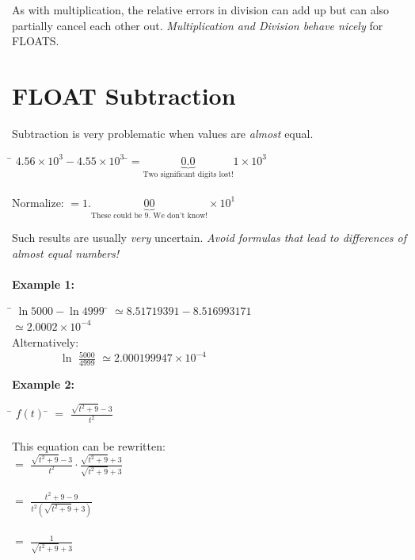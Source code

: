 \documentclass[a4paper,12pt]{report}
\begin{document}
	As with multiplication, the relative errors in division can add up but can also partially cancel each 
	other out. \textit{Multiplication and Division behave nicely }for FLOATS.


\section{FLOAT Subtraction}

	Subtraction is very problematic when values are \textit{almost}  equal.

\begin{tabbing}
	\hspace{3cm}\= $4.56 \times 10^3 - 4.55 \times 10^3$
	\hspace{0.1cm}\=$ = \!\!\!\!\!\!\!\!\!\!\!\!\!\!\!\!\!\!\underbrace{0.0}_{\text{Two significant digits 
	lost!}} \!\!\!\!\!\!\!\!\!\!\!\!\!\!\!\!\!\!\!\!\!\! 1 \times 10^3$\\ \\
	Normalize: \>\>$=1.\!\!\!\!\!\!\!\!\!\!\!\!\!\!\!\!\!\!\!\!\!\!\!\!\!\!\!\!\!\!
		\underbrace{00}_{\text{These could be 9. We don't know!}}
		\!\!\!\!\!\!\!\!\!\!\!\!\!\!\!\!\!\!\!\!\!\!\!\!\!\!\!\!\! \times 10^1$
\end{tabbing}
	
	Such results are usually \textit{very} uncertain. \textit{Avoid formulas that lead to differences of 
	almost equal numbers!}\\ \\

	\noindent \textbf{Example 1:}

\begin{tabbing}
	\hspace*{4cm} \= $\ln5000-\ln4999$ \hspace*{0.1cm}\= $\simeq 8.51719391 - 8.516993171$\\
	\> \> $\simeq 2.0002 \times10^{-4}$ \\
	Alternatively:\\
	\> $\qquad \qquad \; \ln$ \Large{$\!\frac{5000}{4999}$}\> $\simeq 2.000199947
		\times 10^{-4}$
\end{tabbing}

	\noindent \textbf{Example 2:}

\begin{tabbing}
	\hspace*{4cm} \= $f(t)$ \hspace*{0.1cm} \= $\!\! =$ \Large{$\frac{\sqrt{t^2+9}-3}{t^2}$}\\ \\
	This equation can be rewritten:\\
	\> \>$\!\! =$ \Large{$\frac{\sqrt{t^2+9}-3}{t^2} \cdot
		\frac{\sqrt{t^2+9}+3}{\sqrt{t^2+9}+3}$}\\ \\
	\> \> $\!\! =$ \Large{$\frac{t^2+9-9}{t^2(\sqrt{t^2+9}+3)}$}\\ \\
	\> \> $\!\! =$ \Large{$\frac{1}{\sqrt{t^2+9}+3}$}\\
\end{tabbing}
\end{document}
